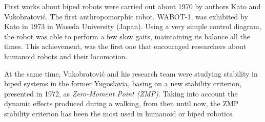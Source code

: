 
First works about biped robots were carried out about 1970 by authors Kato \cite{Kaj} and Vukobratović. The first anthropomorphic robot, WABOT-1, was exhibited by Kato in 1973 in Waseda University (Japan). Using a very simple control diagram, the robot was able to perform a few slow gaits, maintaining its balance all the times. This achievement, was the first one that encouraged researchers about humanoid robots and their locomotion.


At the same time, Vukobratović and his research team were studying stability in biped systems in the former Yugoslavia, basing on a new stability criterion, presented in 1972, as \textit{Zero-Moment Point (ZMP)}. Taking into account the dynamic effects produced during a walking, from then until now, the ZMP stability criterion has been the most used in humanoid or biped robotics.


